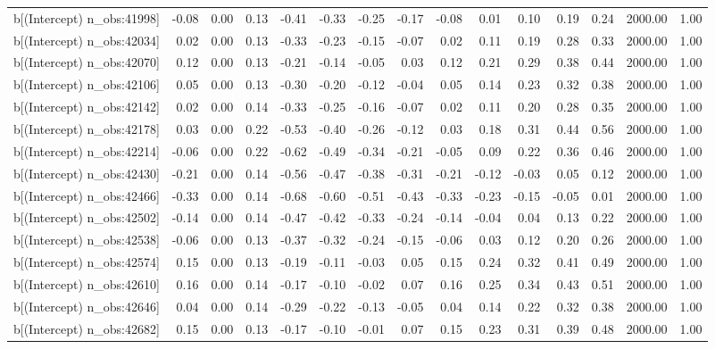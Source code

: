 \begin{table}[ht]
\begin{tabular}{rrrrrrrrrrrrrrr}
  b[(Intercept) n\_obs:41998] & -0.08 & 0.00 & 0.13 & -0.41 & -0.33 & -0.25 & -0.17 & -0.08 & 0.01 & 0.10 & 0.19 & 0.24 & 2000.00 & 1.00 \\ 
  b[(Intercept) n\_obs:42034] & 0.02 & 0.00 & 0.13 & -0.33 & -0.23 & -0.15 & -0.07 & 0.02 & 0.11 & 0.19 & 0.28 & 0.33 & 2000.00 & 1.00 \\ 
  b[(Intercept) n\_obs:42070] & 0.12 & 0.00 & 0.13 & -0.21 & -0.14 & -0.05 & 0.03 & 0.12 & 0.21 & 0.29 & 0.38 & 0.44 & 2000.00 & 1.00 \\ 
  b[(Intercept) n\_obs:42106] & 0.05 & 0.00 & 0.13 & -0.30 & -0.20 & -0.12 & -0.04 & 0.05 & 0.14 & 0.23 & 0.32 & 0.38 & 2000.00 & 1.00 \\ 
  b[(Intercept) n\_obs:42142] & 0.02 & 0.00 & 0.14 & -0.33 & -0.25 & -0.16 & -0.07 & 0.02 & 0.11 & 0.20 & 0.28 & 0.35 & 2000.00 & 1.00 \\ 
  b[(Intercept) n\_obs:42178] & 0.03 & 0.00 & 0.22 & -0.53 & -0.40 & -0.26 & -0.12 & 0.03 & 0.18 & 0.31 & 0.44 & 0.56 & 2000.00 & 1.00 \\ 
  b[(Intercept) n\_obs:42214] & -0.06 & 0.00 & 0.22 & -0.62 & -0.49 & -0.34 & -0.21 & -0.05 & 0.09 & 0.22 & 0.36 & 0.46 & 2000.00 & 1.00 \\ 
  b[(Intercept) n\_obs:42430] & -0.21 & 0.00 & 0.14 & -0.56 & -0.47 & -0.38 & -0.31 & -0.21 & -0.12 & -0.03 & 0.05 & 0.12 & 2000.00 & 1.00 \\ 
  b[(Intercept) n\_obs:42466] & -0.33 & 0.00 & 0.14 & -0.68 & -0.60 & -0.51 & -0.43 & -0.33 & -0.23 & -0.15 & -0.05 & 0.01 & 2000.00 & 1.00 \\ 
  b[(Intercept) n\_obs:42502] & -0.14 & 0.00 & 0.14 & -0.47 & -0.42 & -0.33 & -0.24 & -0.14 & -0.04 & 0.04 & 0.13 & 0.22 & 2000.00 & 1.00 \\ 
  b[(Intercept) n\_obs:42538] & -0.06 & 0.00 & 0.13 & -0.37 & -0.32 & -0.24 & -0.15 & -0.06 & 0.03 & 0.12 & 0.20 & 0.26 & 2000.00 & 1.00 \\ 
  b[(Intercept) n\_obs:42574] & 0.15 & 0.00 & 0.13 & -0.19 & -0.11 & -0.03 & 0.05 & 0.15 & 0.24 & 0.32 & 0.41 & 0.49 & 2000.00 & 1.00 \\ 
  b[(Intercept) n\_obs:42610] & 0.16 & 0.00 & 0.14 & -0.17 & -0.10 & -0.02 & 0.07 & 0.16 & 0.25 & 0.34 & 0.43 & 0.51 & 2000.00 & 1.00 \\ 
  b[(Intercept) n\_obs:42646] & 0.04 & 0.00 & 0.14 & -0.29 & -0.22 & -0.13 & -0.05 & 0.04 & 0.14 & 0.22 & 0.32 & 0.38 & 2000.00 & 1.00 \\ 
  b[(Intercept) n\_obs:42682] & 0.15 & 0.00 & 0.13 & -0.17 & -0.10 & -0.01 & 0.07 & 0.15 & 0.23 & 0.31 & 0.39 & 0.48 & 2000.00 & 1.00 \\ 

\end{tabular}
\end{table}
